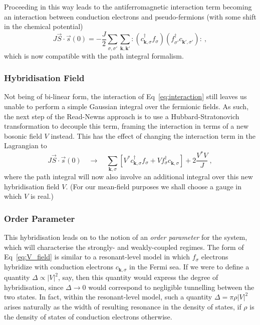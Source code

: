 Proceeding in this way leads to the antiferromagnetic interaction term becoming an interaction between conduction electrons and pseudo-fermions (with some shift in the chemical potential)
\begin{equation}
J\vec{S}\cdot\vec{s}(0) = - \frac{J}{2} \sum_{\sigma, \sigma'} \sum_{\boldsymbol{k}, \boldsymbol{k'}} : \left( c^{\dagger}_{\boldsymbol{k}, \sigma} f^{}_{\sigma} \right) \left( f^{\dagger}_{\sigma'} c^{}_{\boldsymbol{k'}, \sigma'} \right): ~,
\label{eq:interaction}
\end{equation}
which is now compatible with the path integral formalism.

\subsubsection{Hybridisation Field}

Not being of bi-linear form, the interaction of Eq~\eqref{eq:interaction} still leaves us unable to perform a simple Gaussian integral over the fermionic fields. As such, the next step of the Read-Newns approach is to use a Hubbard-Stratonovich \cite{ManyBodyPhysics} transformation to decouple this term, framing the interaction in terms of a new bosonic field $ V $ instead. This has the effect of changing the interaction term in the Lagrangian to
\begin{equation}
J\vec{S}\cdot\vec{s}(0) \quad \rightarrow \quad \sum_{\boldsymbol{k}, \sigma} \left[ V^{\ast} c^{\dagger}_{\boldsymbol{k}, \sigma} f^{}_{\sigma} + V f^{\dagger}_{\sigma} c^{}_{\boldsymbol{k}, \sigma} \right] + 2 \frac{V^{\ast} V}{J} ~,
\label{eq:V_field}
\end{equation}
where the path integral will now also involve an additional integral over this new hybridisation field $ V $. (For our mean-field purposes we shall choose a gauge in which $ V $ is real.)

\subsubsection{Order Parameter}

This hybridisation leads on to the notion of an \emph{order parameter} for the system, which will characterise the strongly- and weakly-coupled regimes. The form of Eq~\eqref{eq:V_field} is similar to a resonant-level model in which $ f_{\sigma} $ electrons hybridize with conduction electrons $ c^{}_{\boldsymbol{k}, \sigma} $ in the Fermi sea. If we were to define a quantity $ \Delta \propto | V |^2 $, say, then this quantity would express the degree of hybridisation, since $ \Delta \rightarrow 0 $ would correspond to negligible tunnelling between the two states. In fact, within the resonant-level model, such a quantity $ \Delta = \pi \rho |V|^2 $ arises naturally as the width of resulting resonance in the density of states, if $ \rho $ is the density of states of conduction electrons otherwise.


